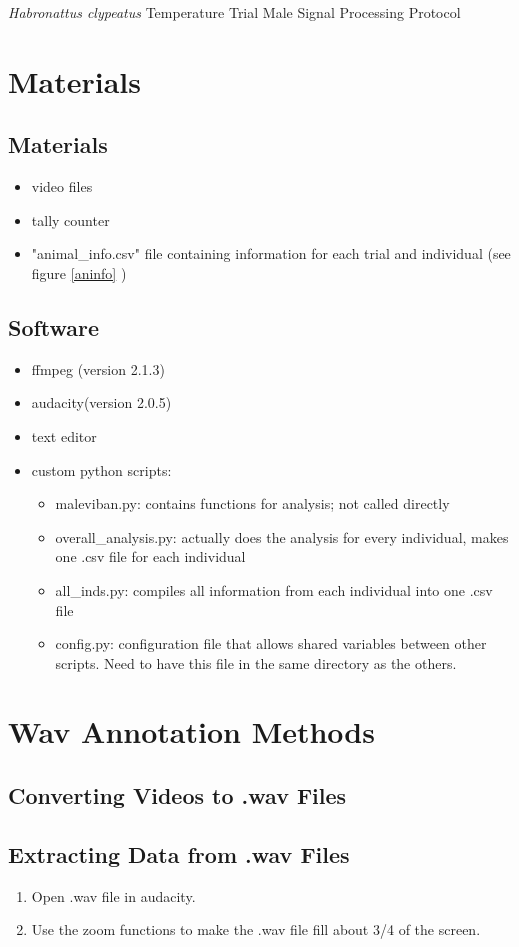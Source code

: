 \documentclass[11 pt]{article}
\begin{document}
{\large \centerline{\emph{Habronattus clypeatus} Temperature Trial Male Signal Processing Protocol}}
\section{Materials}
\subsection{Materials}
\begin{itemize}
\item{video files}
\item{tally counter}
\item "animal\_info.csv" file containing information for each trial and individual (see figure \ref{aninfo} )
\end{itemize}
\subsection{Software}
\begin{itemize}
\item{ffmpeg (version 2.1.3)}
\item{audacity(version 2.0.5)}
\item {text editor}
\item custom python scripts:
\begin{itemize}
\item maleviban.py: contains functions for analysis; not called directly
\item overall\_analysis.py: actually does the analysis for every individual, makes one .csv file for each individual
\item all\_inds.py: compiles all information from each individual into one .csv file
\item config.py: configuration file that allows shared variables between other scripts.  Need to have this file in the same directory as the others.
\end{itemize}
\end{itemize}

\section{Wav Annotation Methods}
\subsection{Converting Videos to .wav Files}
\subsection{Extracting Data from .wav Files}
\begin{enumerate}
\item{Open .wav file in audacity.}
\item{Use the zoom functions to make the .wav file fill about 3/4 of the screen.}
\end{enumerate}
\end{document}
